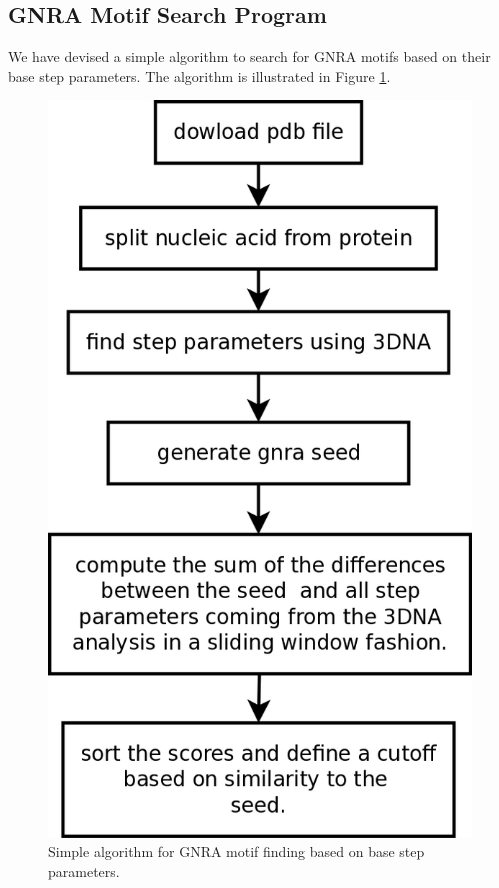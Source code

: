 \subsection{GNRA Motif Search Program}
We have  devised a simple algorithm to search for GNRA  motifs based on
their base  step parameters.  The  algorithm is illustrated  in Figure
\ref{fig:getMotif}.

\begin{figure}
\centering
\includegraphics[angle=0, scale=0.4]{Chapter5/getMotif.png}
\caption{Simple algorithm  for GNRA motif  finding based on  base step
  parameters.}
\label{fig:getMotif}
\end{figure}
  

